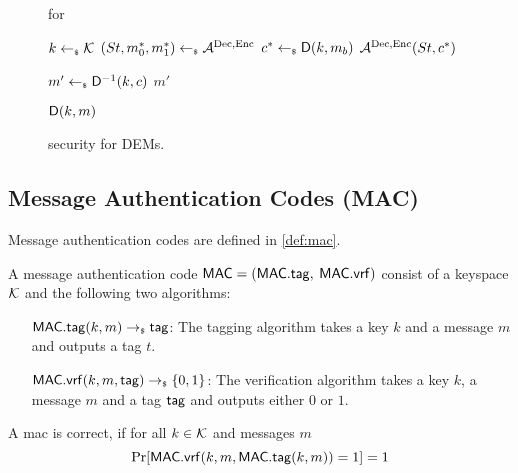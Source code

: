   \begin{figure}[!tbh]
    \begin{gamebox}{\indrcca for \dem}
      \begin{minipage}[t]{.5\linewidth}
        \begin{algorithmic}
          \State $k\gets_{\scriptscriptstyle\$} \mathcal{K}$
          \State $(St, m_0^*, m_1^*) \gets_{\scriptscriptstyle\$} \mathcal{A}_{\relax}^{\text{Dec},\text{Enc}}$
          \State $c^* \gets_{\scriptscriptstyle\$} {\mathsf{D}}(k, m_b)$
          \State \Return $\mathcal{A}_{\relax}^{\text{Dec},\text{Enc}}(St, c^*)$
        \end{algorithmic}
      \end{minipage}
    \hfill
      \begin{minipage}[t]{.48\linewidth}
        \begin{algorithmic}
          \State $m' \gets_{\scriptscriptstyle\$} {\mathsf{D}}^{-1}(k, c)$
          \State \Return {}
          \Else
          \State \Return $m'$
          \EndIf
        \end{algorithmic}
        \medskip
        \begin{algorithmic}
          \State \Return ${\mathsf{D}}(k, m)$
        \end{algorithmic}
      \end{minipage}
    \end{gamebox}
    \caption{\indrcca security for DEMs.}
    \label{fig:dem_rcca}
  \end{figure}

\subsection{Message Authentication Codes (MAC)}
Message authentication codes are defined in \cref{def:mac}.

\begin{definition}\label{def:mac}
  A message authentication code ${\mathsf{MAC}} = ({\mathsf{MAC}}.{\mathsf{tag}},$ $ {\mathsf{MAC}}.{\mathsf{vrf}})$ consist of a keyspace $\mathcal{K}$ and the following two
  algorithms:
  \begin{itemize}[align=left]
    \item[${\mathsf{MAC}}.{\mathsf{tag}}(k, m)\rightarrow_{\scriptscriptstyle\$} {\mathsf{tag}}$:] The tagging algorithm takes a key $k$ and a message $m$ and outputs
      a tag $t$.
    \item[${\mathsf{MAC}}.{\mathsf{vrf}}(k, m, {\mathsf{tag}})\rightarrow_{\scriptscriptstyle\$}\{0,1\}$:] The verification algorithm takes a key $k$, a message $m$ and
      a tag ${\mathsf{tag}}$ and outputs either $0$ or $1$.
    \end{itemize}
    A mac \mac is correct, if for all $k\in\mathcal{K}$ and messages $m$
    \[
      \text{Pr}[{\mathsf{MAC}}.{\mathsf{vrf}}(k, m, {\mathsf{MAC}}.{\mathsf{tag}}(k,m)) = 1] = 1
    \]
\end{definition}


